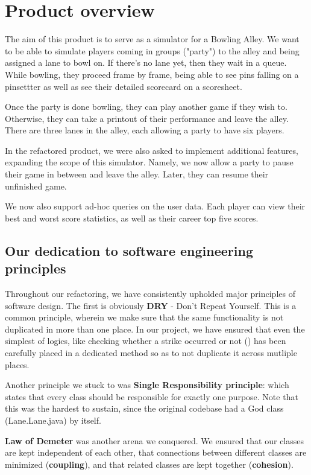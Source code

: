 \section{Product overview}

The aim of this product is to serve as a simulator for a Bowling Alley. We want to be able to simulate players coming in groups ("party") to the alley and being assigned a lane to bowl on. If there's no lane yet, then they wait in a queue. While bowling, they proceed frame by frame, being able to see pins falling on a pinsettter as well as see their detailed scorecard on a scoresheet.

Once the party is done bowling, they can play another game if they wish to. Otherwise, they can take a printout of their performance and leave the alley. There are three lanes in the alley, each allowing a party to have six players.

In the refactored product, we were also asked to implement additional features, expanding the scope of this simulator. Namely, we now allow a party to pause their game in between and leave the alley. Later, they can resume their unfinished game.

We now also support ad-hoc queries on the user data. Each player can view their best and worst score statistics, as well as their career top five scores.

\subsection{Our dedication to software engineering principles}

Throughout our refactoring, we have consistently upholded major principles of software design. The first is obviously \textbf{DRY} - Don't Repeat Yourself. This is a common principle, wherein we make sure that the same functionality is not duplicated in more than one place. In our project, we have ensured that even the simplest of logics, like checking whether a strike occurred or not () has been carefully placed in a dedicated method so as to not duplicate it across mutliple places.

Another principle we stuck to was \textbf{Single Responsibility principle}: which states that every class should be responsible for exactly one purpose. Note that this was the hardest to sustain, since the original codebase had a God class (Lane.Lane.java) by itself.

\textbf{Law of Demeter} was another arena we conquered. We ensured that our classes are kept independent of each other, that connections between different classes are minimized (\textbf{coupling}), and that related classes are kept together (\textbf{cohesion}).

